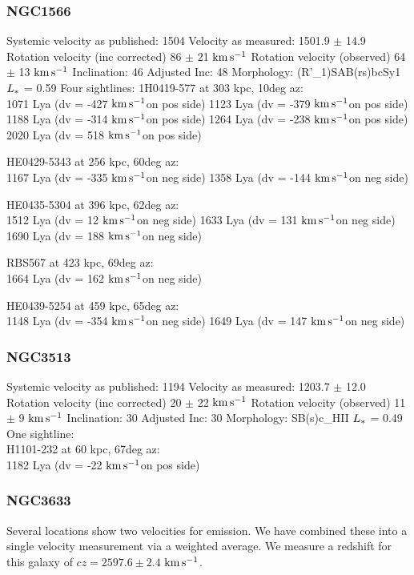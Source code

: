 \documentclass[iop]{emulateapj-rtx4}
\newcommand{\kms}{$\rm km\, s^{-1}$}
\begin{document}
\subsubsection{NGC1566}
Systemic velocity as published: 1504
Velocity as measured: 1501.9 $\pm$ 14.9
Rotation velocity (inc corrected) 86 $\pm$ 21 \kms
Rotation velocity (observed) 64 $\pm$ 13 \kms
Inclination: 46
Adjusted Inc: 48
Morphology: (R'\_1)SAB(rs)bcSy1
$L_{\**}$ = 0.59
Four sightlines: 
1H0419-577 at 303 kpc, 10deg az: \\
1071 Lya (dv = -427 \kms on pos side)
1123 Lya (dv = -379 \kms on pos side)
1188 Lya (dv = -314 \kms on pos side)
1264 Lya (dv = -238 \kms on pos side)
2020 Lya (dv = 518 \kms on pos side)

HE0429-5343 at 256 kpc, 60deg az: \\
1167 Lya (dv = -335 \kms on neg side)
1358 Lya (dv = -144 \kms on neg side)

HE0435-5304 at 396 kpc, 62deg az: \\
1512 Lya (dv = 12 \kms on neg side)
1633 Lya (dv = 131 \kms on neg side)
1690 Lya (dv = 188 \kms on neg side)

RBS567 at 423 kpc, 69deg az: \\
1664 Lya (dv = 162 \kms on neg side)

HE0439-5254 at 459 kpc, 65deg az: \\
1148 Lya (dv = -354 \kms on neg side)
1649 Lya (dv = 147 \kms on neg side)



\subsubsection{NGC3513}
Systemic velocity as published: 1194
Velocity as measured: 1203.7 $\pm$ 12.0
Rotation velocity (inc corrected) 20 $\pm$ 22 \kms
Rotation velocity (observed) 11 $\pm$ 9 \kms
Inclination: 30
Adjusted Inc: 30
Morphology: SB(s)c\_HII
$L_{\**}$ = 0.49 \\

One sightline: \\
H1101-232 at 60 kpc, 67deg az: \\
1182 Lya (dv = -22 \kms on pos side)


\subsubsection{NGC3633}
Several locations show two velocities for emission. We have combined these into a single velocity measurement via a weighted average. We measure a redshift for this galaxy of $cz = 2597.6 \pm 2.4$ \kms.
\end{document}
